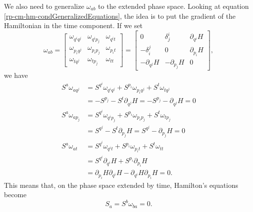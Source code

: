 We also need to generalize $\omega_{ab}$ to the extended phase space. Looking at equation \ref{rp-cm-hm-condGeneralizedEquations}, the idea is to put the gradient of the Hamiltonian in the time component. If we set
\begin{equation}\label{rp-cm-sf-contactForm}
	\tag{SF-EPS}
	\omega_{ab} = \left[\begin{array}{ccc}
		\omega_{q^i q^j} & \omega_{q^i p_j} & \omega_{q^i t} \\
		\omega_{p_i q^j} & \omega_{p_i p_j} & \omega_{p_i t} \\
		\omega_{t q^j} & \omega_{t p_j} & \omega_{t t} 
	\end{array} \right]= \left[\begin{array}{ccc}
		0 & \delta^i_j & \partial_{q^i} H \\
		- \delta_i^j & 0 & \partial_{p_i} H \\
		- \partial_{q^j} H & -\partial_{p_j} H & 0
	\end{array} \right] ,
\end{equation}
we have
\begin{equation}
	\begin{aligned}
		S^a \omega_{a q^j} &= S^{q^i}\omega_{q^i q^j} + S^{p_i}\omega_{p_i q^j} + S^{t} \omega_{t q^j} \\
		&= - S^{p_j} - S^{t} \partial_{q^j} H = - S^{p_j} -  \partial_{q^j} H = 0 \\
		S^a \omega_{a p_j} &= S^{q^i}\omega_{q^i p_j} + S^{p_i}\omega_{p_i p_j} + S^{t} \omega_{t p_j} \\
		&= S^{q^j} - S^{t} \partial_{p_j} H = S^{q^j} -  \partial_{p_j} H = 0 \\
		S^a \omega_{a t} &= S^{q^i}\omega_{q^i t} + S^{p_i}\omega_{p_i t} + S^{t} \omega_{t t} \\
		&= S^{q^i} \partial_{q^i} H + S^{p_i} \partial_{p_i} H \\
		&= \partial_{p_i} H \partial_{q^i} H - \partial_{q^i} H \partial_{p_i} H = 0.
	\end{aligned}
\end{equation}
This means that, on the phase space extended by time, Hamilton's equations become
\begin{equation}\label{rp-cm-hm-extPSEquation}
	\tag{HM-EPS}
	S_a = S^b \omega_{ba} = 0.
\end{equation}
